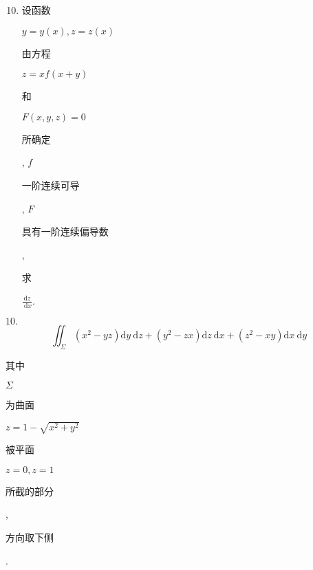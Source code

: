 \documentclass[10pt]{article}
\begin{document}
\begin{enumerate}
  \setcounter{enumi}{9}
  \item \begin{CJK}{UTF8}{mj}设函数\end{CJK} $y=y(x), z=z(x)$ \begin{CJK}{UTF8}{mj}由方程\end{CJK} $z=x f(x+y)$ \begin{CJK}{UTF8}{mj}和\end{CJK} $F(x, y, z)=0$ \begin{CJK}{UTF8}{mj}所确定\end{CJK}, $f$ \begin{CJK}{UTF8}{mj}一阶连续可导\end{CJK}, $F$ \begin{CJK}{UTF8}{mj}具有一阶连续偏导数\end{CJK}, \begin{CJK}{UTF8}{mj}求\end{CJK} $\frac{\mathrm{d} z}{\mathrm{~d} x}$.
\end{enumerate}
$10 .$
$$
\iint_{\Sigma}\left(x^{2}-y z\right) \mathrm{d} y \mathrm{~d} z+\left(y^{2}-z x\right) \mathrm{d} z \mathrm{~d} x+\left(z^{2}-x y\right) \mathrm{d} x \mathrm{~d} y
$$
\begin{CJK}{UTF8}{mj}其中\end{CJK} $\Sigma$ \begin{CJK}{UTF8}{mj}为曲面\end{CJK} $z=1-\sqrt{x^{2}+y^{2}}$ \begin{CJK}{UTF8}{mj}被平面\end{CJK} $z=0, z=1$ \begin{CJK}{UTF8}{mj}所截的部分\end{CJK}, \begin{CJK}{UTF8}{mj}方向取下侧\end{CJK}.
\end{document}

